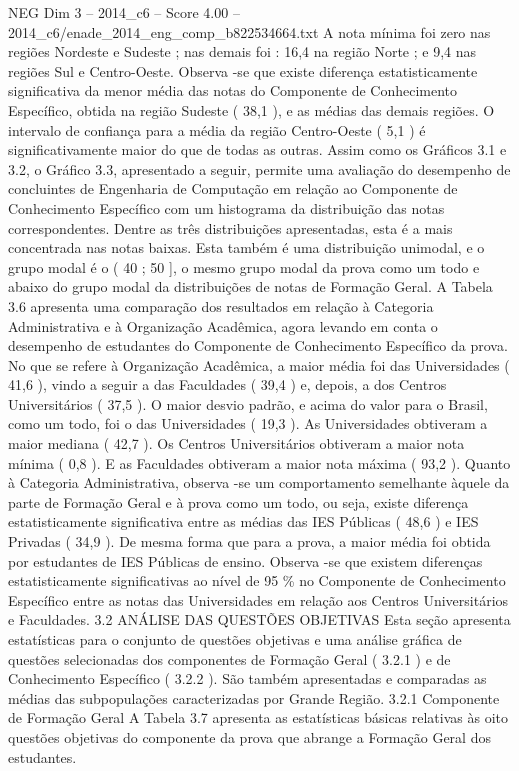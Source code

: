 \begin{textsample}{NEG Dim 3 – 2014\_c6 – Score 4.00 – 2014\_c6/enade\_2014\_eng\_comp\_b822534664.txt}
A nota mínima foi zero nas regiões Nordeste e Sudeste ; nas demais foi : 16,4 na região Norte ; e 9,4 nas regiões Sul e Centro-Oeste.
Observa -se que existe diferença estatisticamente significativa da menor média das notas do Componente de Conhecimento Específico, obtida na região Sudeste ( 38,1 ), e as médias das demais regiões.
O intervalo de confiança para a média da região Centro-Oeste ( 5,1 ) é significativamente maior do que de todas as outras.
Assim como os Gráficos 3.1 e 3.2, o Gráfico 3.3, apresentado a seguir, permite uma avaliação do desempenho de concluintes de Engenharia de Computação em relação ao Componente de Conhecimento Específico com um histograma da distribuição das notas correspondentes.
Dentre as três distribuições apresentadas, esta é a mais concentrada nas notas baixas.
Esta também é uma distribuição unimodal, e o grupo modal é o ( 40 ; 50 ], o mesmo grupo modal da prova como um todo e abaixo do grupo modal da distribuições de notas de Formação Geral.
A Tabela 3.6 apresenta uma comparação dos resultados em relação à Categoria Administrativa e à Organização Acadêmica, agora levando em conta o desempenho de estudantes do Componente de Conhecimento Específico da prova.
No que se refere à Organização Acadêmica, a maior média foi das Universidades ( 41,6 ), vindo a seguir a das Faculdades ( 39,4 ) e, depois, a dos Centros Universitários ( 37,5 ).
O maior desvio padrão, e acima do valor para o Brasil, como um todo, foi o das Universidades ( 19,3 ).
As Universidades obtiveram a maior mediana ( 42,7 ).
Os Centros Universitários obtiveram a maior nota mínima ( 0,8 ).
E as Faculdades obtiveram a maior nota máxima ( 93,2 ).
Quanto à Categoria Administrativa, observa -se um comportamento semelhante àquele da parte de Formação Geral e à prova como um todo, ou seja, existe diferença estatisticamente significativa entre as médias das IES Públicas ( 48,6 ) e IES Privadas ( 34,9 ).
De mesma forma que para a prova, a maior média foi obtida por estudantes de IES Públicas de ensino.
Observa -se que existem diferenças estatisticamente significativas ao nível de 95 \% no Componente de Conhecimento Específico entre as notas das Universidades em relação aos Centros Universitários e Faculdades. 3.2 ANÁLISE DAS QUESTÕES OBJETIVAS Esta seção apresenta estatísticas para o conjunto de questões objetivas e uma análise gráfica de questões selecionadas dos componentes de Formação Geral ( 3.2.1 ) e de Conhecimento Específico ( 3.2.2 ).
São também apresentadas e comparadas as médias das subpopulações caracterizadas por Grande Região. 3.2.1 Componente de Formação Geral A Tabela 3.7 apresenta as estatísticas básicas relativas às oito questões objetivas do componente da prova que abrange a Formação Geral dos estudantes.

\end{textsample}
